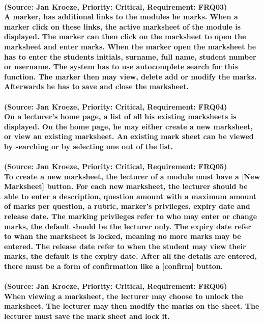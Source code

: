 \documentclass[12pt]{article}
\begin{document}
  \paragraph{(Source: Jan Kroeze, Priority: Critical, Requirement: FRQ03) \\
  A marker, has additional links to the modules he marks. When a marker click on these links, the active marksheet of the module is displayed. The marker can then click on the marksheet to open the marksheet and enter marks. When the marker open the marksheet he has to enter the students initials, surname, full name, student number or username. The system has to use autocomplete search for this function. The marker then may view, delete add or modify the marks. Afterwards he has to save and close the marksheet.}
  \paragraph{(Source: Jan Kroeze, Priority: Critical, Requirement: FRQ04) \\
  On a lecturer's home page, a list of all his existing marksheets is displayed. On the home page, he may either create a new marksheet, or view an existing marksheet. An existing mark sheet can be viewed by searching or by selecting one out of the list.}
  \paragraph{(Source: Jan Kroeze, Priority: Critical, Requirement: FRQ05) \\
  To create a new marksheet, the lecturer of a module must have a [New Marksheet] button. For each new marksheet, the lecturer should be able to enter a description, question amount with a maximum amount of marks per question, a rubric, marker's privileges, expiry date and release date. The marking privileges refer to who may enter or change marks, the default should be the lecturer only. The expiry date refer to whan the marksheet is locked, meaning no more marks may be entered. The release date refer to when the student may view their marks, the default is the expiry date. After all the details are entered, there must be a form of confirmation like a [confirm] button.}
  \paragraph{(Source: Jan Kroeze, Priority: Critical, Requirement: FRQ06) \\
  When viewing a marksheet, the lecturer may choose to unlock the marksheet. The lecturer may then modify the marks on the sheet. The lecturer must save the mark sheet and lock it. }
\end{document}

